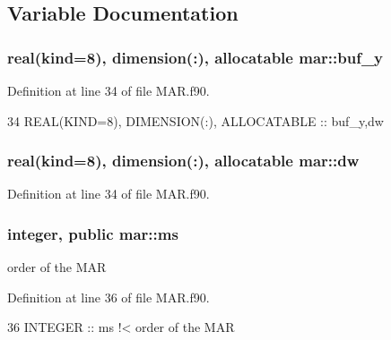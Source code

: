 \subsection{Variable Documentation}
\subsubsection[{\texorpdfstring{buf\+\_\+y}{buf_y}}]{\setlength{\rightskip}{0pt plus 5cm}real(kind=8), dimension(\+:), allocatable mar\+::buf\+\_\+y\hspace{0.3cm}{\ttfamily [private]}}\hypertarget{namespacemar_a91d79995717316d4fcea39b2e476324c}{}\label{namespacemar_a91d79995717316d4fcea39b2e476324c}


Definition at line 34 of file M\+A\+R.\+f90.


\begin{DoxyCode}
34   \textcolor{keywordtype}{REAL(KIND=8)}, \textcolor{keywordtype}{DIMENSION(:)}, \textcolor{keywordtype}{ALLOCATABLE} :: buf\_y,dw
\end{DoxyCode}
\subsubsection[{\texorpdfstring{dw}{dw}}]{\setlength{\rightskip}{0pt plus 5cm}real(kind=8), dimension(\+:), allocatable mar\+::dw\hspace{0.3cm}{\ttfamily [private]}}\hypertarget{namespacemar_a5fbf8b9142fbfce9bdd17cb573a448c3}{}\label{namespacemar_a5fbf8b9142fbfce9bdd17cb573a448c3}


Definition at line 34 of file M\+A\+R.\+f90.

\subsubsection[{\texorpdfstring{ms}{ms}}]{\setlength{\rightskip}{0pt plus 5cm}integer, public mar\+::ms}\hypertarget{namespacemar_a12c0dbfaa748dffd1cd2f96b19b53102}{}\label{namespacemar_a12c0dbfaa748dffd1cd2f96b19b53102}


order of the M\+AR 



Definition at line 36 of file M\+A\+R.\+f90.


\begin{DoxyCode}
36   \textcolor{keywordtype}{INTEGER} :: ms\textcolor{comment}{ !< order of the MAR}
\end{DoxyCode}
